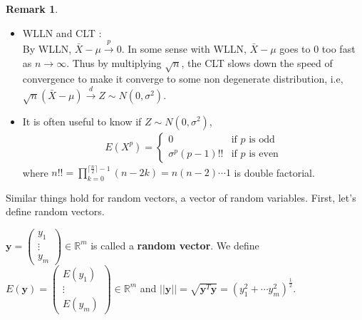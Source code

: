 \documentclass[11pt]{article} %
\theoremstyle{definition}
\numberwithin{defn}{subsection}
\numberwithin{thm}{subsection}
\newtheorem*{rmk}{Remark}
\numberwithin{ex}{subsection}
\newcommand{\bb}[1]{\mathbb{#1}}
\newcommand{\R}{\bb{R}}
\newcommand{\plim}{\overset{p}{\rightarrow}}
\newcommand{\dlim}{\overset{d}{\rightarrow}}
\newcommand{\ninfty}{n\rightarrow\infty}
\begin{document}
\begin{rmk}\leavevmode
	\begin{itemize}
		\item WLLN and CLT :\\
		By WLLN, $\bar{X}-\mu\plim 0$. In some sense with WLLN, $\bar{X}-\mu$ goes to 0 too fast as $\ninfty$. Thus by multiplying $\sqrt{n}$, the CLT slows down the speed of convergence to make it converge to some non degenerate distribution, i.e, $\sqrt{n}(\bar{X}-\mu)\dlim Z\sim N(0,\sigma^2)$.
		\item It is often useful to know if $Z\sim N(0,\sigma^2)$,
		\begin{align*}
		E(X^p)=\begin{cases}
		0&\text{if }p\text{ is odd}\\
		\sigma^p(p-1)!!&\text{if }p\text{ is even}
		\end{cases}
		\end{align*}
		where $n!!=\prod_{k=0}^{\lceil\frac{n}{2}\rceil-1}(n-2k)=n(n-2)\cdots 1 $ is double factorial.
	\end{itemize}
\end{rmk}



Similar things hold for random vectors, a vector of random variables. First, let's define random vectors.

\begin{defn}
	$\bm{y}=\begin{pmatrix}y_1\\\vdots\\y_m\end{pmatrix}\in\R^m$ is called a \textbf{random vector}. We define $E(\bm{y})=\begin{pmatrix}E(y_1)\\\vdots\\E(y_m)\end{pmatrix}\in\R^m$ and $||\bm{y}||=\sqrt{\bm{y}^T\bm{y}}=(y_1^2+\cdots y_m^2)^{\frac{1}{2}}$.
\end{defn}
\end{document}
